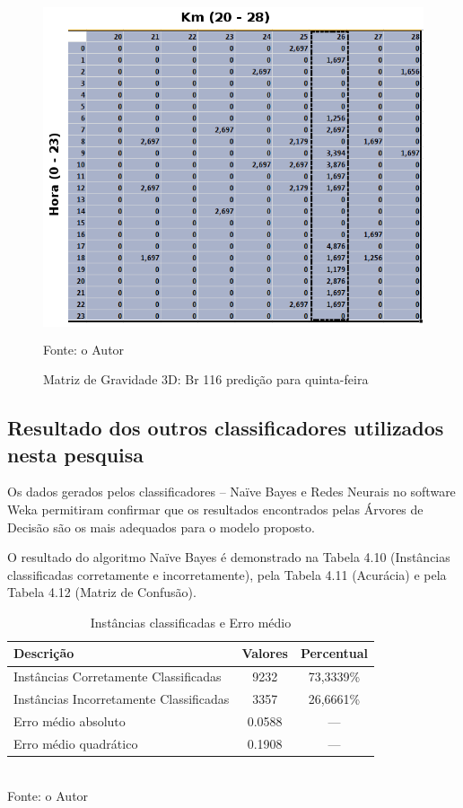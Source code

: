 \begin{figure}[htbp!]
	\centering
	\caption{Matriz de Gravidade 3D: Br 116 predição para quinta-feira}
	\label{fig:MatrizMortos2d-101}
	\includegraphics[width=120mm, height=100mm]{Figuras/Resultados/MGrav3D116}\\
	\tiny Fonte: o Autor
\end{figure}


\pagebreak

\subsection{Resultado dos outros classificadores utilizados nesta pesquisa}

Os dados gerados pelos classificadores -- Naïve Bayes e Redes Neurais no software Weka permitiram confirmar que os resultados encontrados pelas Árvores de Decisão são os mais adequados para o modelo proposto.

O resultado do algoritmo Naïve Bayes é demonstrado na Tabela 4.10 (Instâncias classificadas corretamente e incorretamente), pela Tabela 4.11 (Acurácia) e pela Tabela 4.12 (Matriz de Confusão).

	\begin{table}[!ht]
		\centering
		\caption{Instâncias classificadas e Erro médio}
		\vspace{1mm}
		\begin{tabular}{l|c|c}
			\hline
			\textbf{Descrição} & \textbf{Valores} & \textbf{Percentual} \\
			\hline
			Instâncias Corretamente Classificadas & 9232 & 73,3339\% \\
			Instâncias Incorretamente Classificadas & 3357 & 26,6661\% \\
			Erro médio absoluto & 0.0588 & ---  \\
			Erro médio quadrático & 0.1908 & --- \\
		\end{tabular}
		\\
		\tiny Fonte: o Autor
	\end{table}


